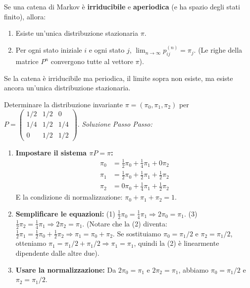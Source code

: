 \begin{theorem}
Se una catena di Markov è \textbf{irriducibile} e \textbf{aperiodica} (e ha spazio degli stati finito), allora:
\begin{enumerate}
    \item Esiste un'unica distribuzione stazionaria $\pi$.
    \item Per ogni stato iniziale $i$ e ogni stato $j$, $\lim_{n \to \infty} p_{ij}^{(n)} = \pi_j$.
    (Le righe della matrice $P^n$ convergono tutte al vettore $\pi$).
\end{enumerate}
Se la catena è irriducibile ma periodica, il limite sopra non esiste, ma esiste ancora un'unica distribuzione stazionaria.
\end{theorem}

\begin{example}
Determinare la distribuzione invariante $\pi = (\pi_0, \pi_1, \pi_2)$ per $P = \begin{pmatrix} 1/2 & 1/2 & 0 \\ 1/4 & 1/2 & 1/4 \\ 0 & 1/2 & 1/2 \end{pmatrix}$.
\textit{Soluzione Passo Passo:}
\begin{enumerate}
    \item \textbf{Impostare il sistema $\pi P = \pi$:}
    \begin{align*}
        \pi_0 &= \frac{1}{2}\pi_0 + \frac{1}{4}\pi_1 + 0\pi_2 \\
        \pi_1 &= \frac{1}{2}\pi_0 + \frac{1}{2}\pi_1 + \frac{1}{2}\pi_2 \\
        \pi_2 &= 0\pi_0 + \frac{1}{4}\pi_1 + \frac{1}{2}\pi_2
    \end{align*}
    E la condizione di normalizzazione: $\pi_0 + \pi_1 + \pi_2 = 1$.
    \item \textbf{Semplificare le equazioni:}
    (1) $\frac{1}{2}\pi_0 = \frac{1}{4}\pi_1 \Rightarrow 2\pi_0 = \pi_1$.
    (3) $\frac{1}{2}\pi_2 = \frac{1}{4}\pi_1 \Rightarrow 2\pi_2 = \pi_1$.
    (Notare che la (2) diventa: $\frac{1}{2}\pi_1 = \frac{1}{2}\pi_0 + \frac{1}{2}\pi_2 \Rightarrow \pi_1 = \pi_0 + \pi_2$. Se sostituiamo $\pi_0=\pi_1/2$ e $\pi_2=\pi_1/2$, otteniamo $\pi_1 = \pi_1/2 + \pi_1/2 \Rightarrow \pi_1=\pi_1$, quindi la (2) è linearmente dipendente dalle altre due).
    \item \textbf{Usare la normalizzazione:}
    Da $2\pi_0 = \pi_1$ e $2\pi_2 = \pi_1$, abbiamo $\pi_0 = \pi_1/2$ e $\pi_2 = \pi_1/2$.

\end{enumerate}
\end{example}
